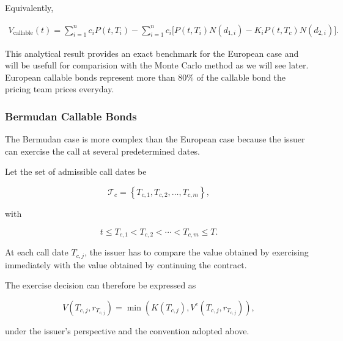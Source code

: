 \documentclass{article}
\begin{document}
Equivalently,

\begin{equation}
\begin{aligned}
    V_{\mathrm{callable}}(t)
    =
    \sum_{i=1}^{n}c_iP(t,T_i)
    -
    \sum_{i=1}^{n}c_i
    \Big[
        P(t,T_i)N(d_{1,i})
        -
        K_iP(t,T_c)N(d_{2,i})
    \Big].
\end{aligned}
\end{equation}

This analytical result provides an exact benchmark for the
European case and will be usefull for comparision with the Monte Carlo method as we will see later. European callable bonds represent more than 80\% of the callable bond the pricing team prices everyday.



\subsubsection{Bermudan Callable Bonds}

The Bermudan case is more complex than the European case because
the issuer can exercise the call at several predetermined dates.

Let the set of admissible call dates be

\begin{equation}
    \mathcal{T}_c
    =
    \left\{
        T_{c,1},
        T_{c,2},
        \ldots,
        T_{c,m}
    \right\},
\end{equation}

with

\begin{equation}
    t
    \leq
    T_{c,1}
    <
    T_{c,2}
    <
    \cdots
    <
    T_{c,m}
    \leq T.
\end{equation}

At each call date $T_{c,j}$, the issuer has to compare the value
obtained by exercising immediately with the value obtained by
continuing the contract.

The exercise decision can therefore be expressed as

\begin{equation}
    V(T_{c,j},r_{T_{c,j}})
    =
    \min
    \left(
        K(T_{c,j}),
        V^c(T_{c,j},r_{T_{c,j}})
    \right),
\end{equation}

under the issuer's perspective and the convention adopted above.
\end{document}
